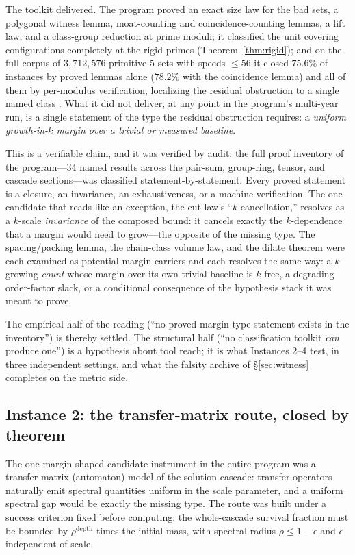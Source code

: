 \documentclass[11pt,a4paper]{article}
\numberwithin{equation}{section}
\theoremstyle{plain}
\theoremstyle{definition}
\theoremstyle{remark}
\begin{document}
The toolkit delivered. The program proved an exact size law for the bad
sets, a polygonal witness lemma, moat-counting and coincidence-counting
lemmas, a lift law, and a class-group reduction at prime moduli; it
classified the unit covering configurations completely at the rigid
primes (Theorem~\ref{thm:rigid}); and on the full corpus of
$3{,}712{,}576$ primitive $5$-sets with speeds $\le 56$ it closed
$75.6\%$ of instances by proved lemmas alone ($78.2\%$ with the
coincidence lemma) and all of them by per-modulus verification,
localizing the residual obstruction to a single named class
\cite{prog-artifacts}. What it did not deliver, at any point in the
program's multi-year run, is a single statement of the type the residual
obstruction requires: a \emph{uniform growth-in-$k$ margin over a trivial
or measured baseline}.

This is a verifiable claim, and it was verified by audit: the full proof
inventory of the program---$34$ named results across the pair-sum,
group-ring, tensor, and cascade sections---was classified
statement-by-statement. Every proved statement is a closure, an
invariance, an exhaustiveness, or a machine verification. The one
candidate that reads like an exception, the cut law's
``$k$-cancellation,'' resolves as a $k$-scale \emph{invariance} of the
composed bound: it cancels exactly the $k$-dependence that a margin
would need to grow---the opposite of the missing type. The
spacing/packing lemma, the chain-class volume law, and the dilate theorem
were each examined as potential margin carriers and each resolves the
same way: a $k$-growing \emph{count} whose margin over its own trivial
baseline is $k$-free, a degrading order-factor slack, or a conditional
consequence of the hypothesis stack it was meant to prove.

The empirical half of the reading (``no proved margin-type statement
exists in the inventory'') is thereby settled. The structural half (``no
classification toolkit \emph{can} produce one'') is a hypothesis about
tool reach; it is what Instances 2--4 test, in three independent
settings, and what the falsity archive of \S\ref{sec:witness} completes
on the metric side.

\subsection{Instance 2: the transfer-matrix route, closed by theorem}
\label{sec:tm-transfer}

The one margin-shaped candidate instrument in the entire program was a
transfer-matrix (automaton) model of the solution cascade: transfer
operators naturally emit spectral quantities uniform in the scale
parameter, and a uniform spectral gap would be exactly the missing type.
The route was built under a success criterion fixed before computing:
the whole-cascade survival fraction must be bounded by
$\rho^{\mathrm{depth}}$ times the initial mass, with spectral radius
$\rho\le 1-\epsilon$ and $\epsilon$ independent of scale.
\end{document}

